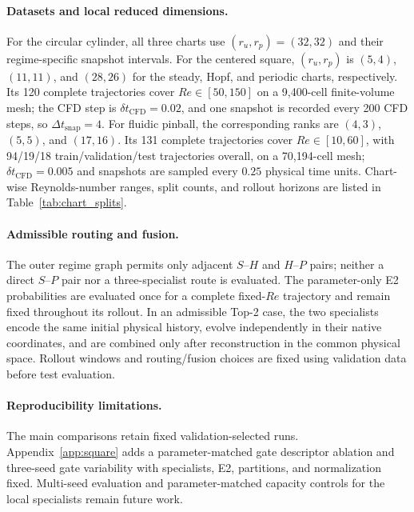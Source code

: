 \paragraph{Datasets and local reduced dimensions.}
For the circular cylinder, all three charts use $(r_u,r_p)=(32,32)$ and their regime-specific snapshot intervals. For the centered square, $(r_u,r_p)$ is $(5,4)$, $(11,11)$, and $(28,26)$ for the steady, Hopf, and periodic charts, respectively. Its 120 complete trajectories cover $Re\in[50,150]$ on a 9,400-cell finite-volume mesh; the CFD step is $\delta t_{\mathrm{CFD}}=0.02$, and one snapshot is recorded every 200 CFD steps, so $\Delta t_{\mathrm{snap}}=4$. For fluidic pinball, the corresponding ranks are $(4,3)$, $(5,5)$, and $(17,16)$. Its 131 complete trajectories cover $Re\in[10,60]$, with 94/19/18 train/validation/test trajectories overall, on a 70,194-cell mesh; $\delta t_{\mathrm{CFD}}=0.005$ and snapshots are sampled every $0.25$ physical time units. Chart-wise Reynolds-number ranges, split counts, and rollout horizons are listed in Table~\ref{tab:chart_splits}.

\paragraph{Admissible routing and fusion.}
The outer regime graph permits only adjacent $S$--$H$ and $H$--$P$ pairs; neither a direct $S$--$P$ pair nor a three-specialist route is evaluated. The parameter-only E2 probabilities are evaluated once for a complete fixed-$Re$ trajectory and remain fixed throughout its rollout. In an admissible Top-2 case, the two specialists encode the same initial physical history, evolve independently in their native coordinates, and are combined only after reconstruction in the common physical space. Rollout windows and routing/fusion choices are fixed using validation data before test evaluation.

\paragraph{Reproducibility limitations.}
The main comparisons retain fixed validation-selected runs. Appendix~\ref{app:square}
adds a parameter-matched gate descriptor ablation and three-seed gate variability
with specialists, E2, partitions, and normalization fixed. Multi-seed evaluation
and parameter-matched capacity controls for the local specialists remain future work.
